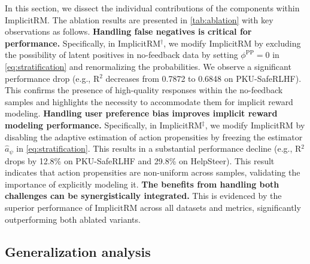 \documentclass[]{arxiv_singlecolumn}
\theoremstyle{plain}
\theoremstyle{definition}
\theoremstyle{remark}
\begin{document}
In this section, we dissect the individual contributions of the components within ImplicitRM. The ablation results are presented in \autoref{tab:ablation} with key observations as follows.
 \textbf{Handling false negatives  is critical for performance.} Specifically, in ImplicitRM$^\dagger$, we modify ImplicitRM by excluding the possibility of latent positives in no-feedback data by setting $\phi^\mathrm{PP}=0$ in \eqref{eq:stratification} and renormalizing the probabilities. We observe a significant performance drop (e.g., R$^2$ decreases from 0.7872 to 0.6848 on PKU-SafeRLHF). This confirms the presence of high-quality responses within the no-feedback samples and highlights the necessity to accommodate them for implicit reward modeling.
 \textbf{Handling user preference bias improves implicit reward modeling performance.} Specifically, in ImplicitRM$^\ddagger$, we modify ImplicitRM by disabling the adaptive estimation of action propensities by freezing the estimator $\hat{a}_\psi$ in \eqref{eq:stratification}. This results in a substantial performance decline (e.g., R$^2$ drops by 12.8\% on PKU-SafeRLHF and 29.8\% on HelpSteer). This result indicates that action propensities are non-uniform across samples, validating the importance of explicitly modeling it.
 \textbf{The benefits from handling both challenges can be synergistically integrated.} This is evidenced by the superior performance of ImplicitRM across all datasets and metrics, significantly outperforming both ablated variants.










\subsection{Generalization analysis}
\label{sec:generalize}
\end{document}
